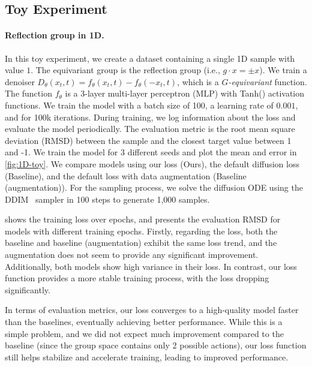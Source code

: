 
\subsection{Toy Experiment}

\paragraph{Reflection group in 1D.} In this toy experiment, we create a dataset containing a single 1D sample with value \( 1 \). The equivariant group is the reflection group (i.e., \( g \cdot x = \pm x \)). We train a denoiser \( D_\theta(x_t, t) = f_\theta(x_t, t) - f_\theta(-x_t, t) \), which is a \emph{\( G \)-equivariant} function. The function \( f_\theta \) is a 3-layer multi-layer perceptron (MLP) with Tanh() activation functions. We train the model with a batch size of 100, a learning rate of \( 0.001 \), and for 100k iterations. During training, we log information about the loss and evaluate the model periodically. The evaluation metric is the root mean square deviation (RMSD) between the sample and the closest target value between 1 and -1. We train the model for 3 different seeds and plot the mean and error in \cref{fig:1D-toy}. We compare models using our loss (Ours), the default diffusion loss (Baseline), and the default loss with data augmentation (Baseline (augmentation)). For the sampling process, we solve the diffusion ODE using the DDIM~ sampler in 100 steps to generate 1,000 samples. 



 shows the training loss over epochs, and  presents the evaluation RMSD for models with different training epochs. Firstly, regarding the loss, both the baseline and baseline (augmentation) exhibit the same loss trend, and the augmentation does not seem to provide any significant improvement. Additionally, both models show high variance in their loss. In contrast, our loss function provides a more stable training process, with the loss dropping significantly. 

In terms of evaluation metrics, our loss converges to a high-quality model faster than the baselines, eventually achieving better performance. While this is a simple problem, and we did not expect much improvement compared to the baseline (since the group space contains only 2 possible actions), our loss function still helps stabilize and accelerate training, leading to improved performance.

